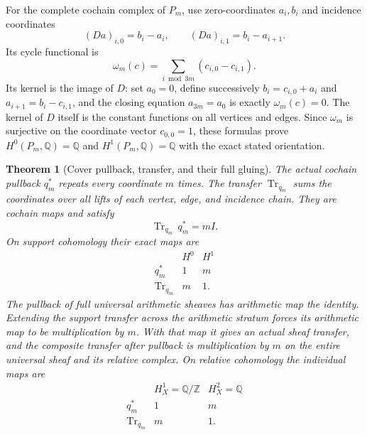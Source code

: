 \documentclass[11pt,a4paper]{article}
\newtheorem{theorem}{Theorem}[section]
\theoremstyle{definition}\newtheorem{definition}[theorem]{Definition}
\newcommand{\Z}{\mathbb Z}\newcommand{\Q}{\mathbb Q}
\begin{document}
For the complete cochain complex of $P_m$, use zero-coordinates
$a_i,b_i$ and incidence coordinates
\[
 (Da)_{i,0}=b_i-a_i,\qquad(Da)_{i,1}=b_i-a_{i+1}.
\]
Its cycle functional is
\[
 \omega_m(c)=\sum_{i\bmod3m}(c_{i,0}-c_{i,1}).
 \tag{SE30}\label{eq:cover-cycle-coordinate}
\]
Its kernel is the image of $D$: set $a_0=0$, define successively
$b_i=c_{i,0}+a_i$ and $a_{i+1}=b_i-c_{i,1}$, and the closing equation
$a_{3m}=a_0$ is exactly $\omega_m(c)=0$. The kernel of $D$ itself
is the constant functions on all vertices and edges. Since
$\omega_m$ is surjective on the coordinate vector $c_{0,0}=1$,
these formulas prove $H^0(P_m,\Q)=\Q$ and $H^1(P_m,\Q)=\Q$ with
the exact stated orientation.

\begin{theorem}[Cover pullback, transfer, and their full gluing]
\label{thm:cover-degree}
The actual cochain pullback $q_m^*$ repeats every coordinate $m$
times. The transfer $\operatorname{Tr}_{q_m}$ sums the coordinates
over all lifts of each vertex, edge, and incidence chain. They are
cochain maps and satisfy
\[
 \operatorname{Tr}_{q_m}\,q_m^*=mI.
 \tag{SE31}\label{eq:cover-transfer-identity}
\]
On support cohomology their exact maps are
\[
\begin{array}{c|cc}
 &H^0&H^1\\ \hline
 q_m^*&1&m\\
 \operatorname{Tr}_{q_m}&m&1.
\end{array}
 \tag{SE32}\label{eq:cover-cohomology}
\]
The pullback of full universal arithmetic sheaves has arithmetic map
the identity. Extending the support transfer across the arithmetic
stratum forces its arithmetic map to be multiplication by $m$.
With that map it gives an actual sheaf transfer, and the composite
transfer after pullback is multiplication by $m$ on the entire
universal sheaf and its relative complex. On relative cohomology the
individual maps are
\[
\begin{array}{c|cc}
 &H_X^1=\Q/\Z&H_X^2=\Q\\ \hline
 q_m^*&1&m\\
 \operatorname{Tr}_{q_m}&m&1.
\end{array}
 \tag{SE33}\label{eq:cover-relative-cohomology}
\]
\end{theorem}
\end{document}
